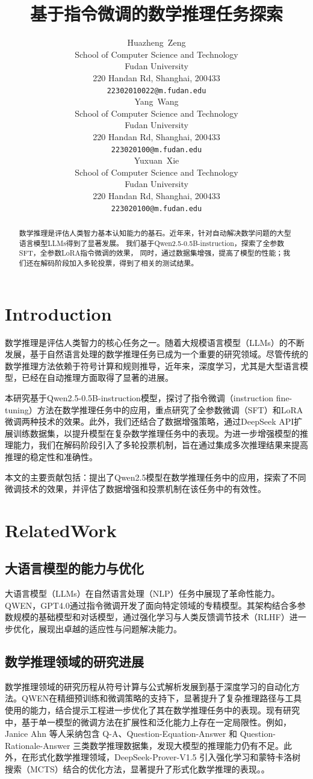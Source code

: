 \documentclass{article}
\title{基于指令微调的数学推理任务探索}
\author{
    Huazheng~Zeng\\
    School of Computer Science and Technology \\
    Fudan University \\
    220 Handan Rd, Shanghai, 200433 \\
    \texttt{22302010022@m.fudan.edu} \\
    \AND
    Yang~Wang\\
    School of Computer Science and Technology \\
    Fudan University \\
    220 Handan Rd, Shanghai, 200433 \\
    \texttt{223020100@m.fudan.edu} \\
    \AND
    Yuxuan~Xie\\
    School of Computer Science and Technology \\
    Fudan University \\
    220 Handan Rd, Shanghai, 200433 \\
    \texttt{223020100@m.fudan.edu} \\
}
\begin{document}
\maketitle


\begin{abstract}
  数学推理是评估人类智力基本认知能力的基石。近年来，针对自动解决数学问题的大型语言模型LLMs得到了显著发展。
  我们基于Qwen2.5-0.5B-instruction，探索了全参数SFT，全参数LoRA指令微调的效果，
  同时，通过数据集增强，提高了模型的性能；我们还在解码阶段加入多轮投票，得到了相关的测试结果。
\end{abstract}



\section{Introduction}

数学推理是评估人类智力的核心任务之一。随着大规模语言模型（LLMs）的不断发展，基于自然语言处理的数学推理任务已成为一个重要的研究领域。尽管传统的数学推理方法依赖于符号计算和规则推导，近年来，深度学习，尤其是大型语言模型，已经在自动推理方面取得了显著的进展。

本研究基于Qwen2.5-0.5B-instruction模型，探讨了指令微调（instruction fine-tuning）方法在数学推理任务中的应用，重点研究了全参数微调（SFT）和LoRA微调两种技术的效果。此外，我们还结合了数据增强策略，通过DeepSeek API扩展训练数据集，以提升模型在复杂数学推理任务中的表现。为进一步增强模型的推理能力，我们在解码阶段引入了多轮投票机制，旨在通过集成多次推理结果来提高推理的稳定性和准确性。

本文的主要贡献包括：提出了Qwen2.5模型在数学推理任务中的应用，探索了不同微调技术的效果，并评估了数据增强和投票机制在该任务中的有效性。







\section{RelatedWork}
\subsection{大语言模型的能力与优化}大语言模型（LLMs）在自然语言处理（NLP）任务中展现了革命性能力。QWEN，GPT4.0通过指令微调开发了面向特定领域的专精模型。其架构结合多参数规模的基础模型和对话模型，通过强化学习与人类反馈调节技术（RLHF）进一步优化，展现出卓越的适应性与问题解决能力\cite{3}\cite{8}。
\subsection{数学推理领域的研究进展}数学推理领域的研究历程从符号计算与公式解析发展到基于深度学习的自动化方法。QWEN在精细预训练和微调策略的支持下，显著提升了复杂推理路径与工具使用的能力，结合提示工程进一步优化了其在数学推理任务中的表现。现有研究中，基于单一模型的微调方法在扩展性和泛化能力上存在一定局限性。例如，Janice Ahn 等人采纳包含 Q-A、Question-Equation-Answer 和 Question-Rationale-Answer 三类数学推理数据集，发现大模型的推理能力仍有不足\cite{4}。此外，在形式化数学推理领域，DeepSeek-Prover-V1.5 引入强化学习和蒙特卡洛树搜索（MCTS）结合的优化方法，显著提升了形式化数学推理的表现。\cite{11}。
\end{document}
